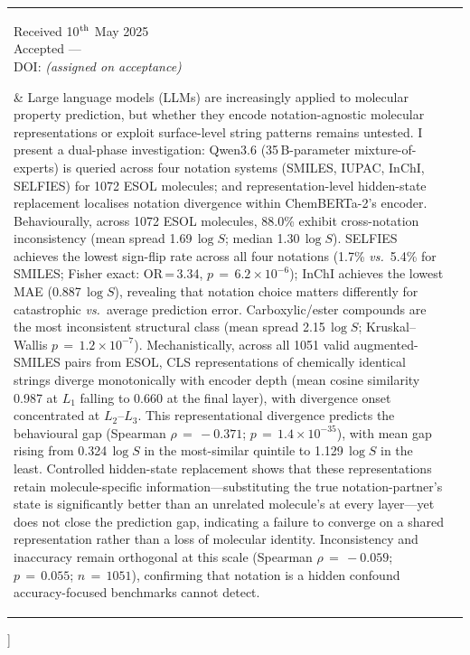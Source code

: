 \documentclass[twoside,twocolumn,9pt]{article}
\newcommand{\logS}{\ensuremath{\log S}}
\begin{document}
\begin{@twocolumnfalse}
\begin{tabular}{m{4.5cm} p{13.5cm} }
\parbox{4.2cm}{\sffamily\scriptsize
  Received 10$^{\rm th}$ May 2025\\
  Accepted \phantom{10}---\phantom{May 2025}\\[3pt]
  DOI: \textit{(assigned on acceptance)}} &
\noindent\normalsize{%
Large language models (LLMs) are increasingly applied to molecular property prediction, but whether they encode notation-agnostic molecular representations or exploit surface-level string patterns remains untested. I present a dual-phase investigation: Qwen3.6 (35\,B-parameter mixture-of-experts) is queried across four notation systems (SMILES, IUPAC, InChI, SELFIES) for 1072 ESOL molecules; and representation-level hidden-state replacement localises notation divergence within ChemBERTa-2's encoder. Behaviourally, across 1072 ESOL molecules, 88.0\% exhibit cross-notation inconsistency (mean spread 1.69\,$\logS$; median 1.30\,$\logS$). SELFIES achieves the lowest sign-flip rate across all four notations (1.7\% \textit{vs.}\ 5.4\% for SMILES; Fisher exact: OR\,=\,3.34, $p\,=\,6.2\!\times\!10^{-6}$); InChI achieves the lowest MAE (0.887\,$\logS$), revealing that notation choice matters differently for catastrophic \textit{vs.}\ average prediction error. Carboxylic/ester compounds are the most inconsistent structural class (mean spread 2.15\,$\logS$; Kruskal--Wallis $p\,=\,1.2\!\times\!10^{-7}$). Mechanistically, across all 1051 valid augmented-SMILES pairs from ESOL, CLS representations of chemically identical strings diverge monotonically with encoder depth (mean cosine similarity 0.987 at $L_1$ falling to 0.660 at the final layer), with divergence onset concentrated at $L_2$--$L_3$. This representational divergence predicts the behavioural gap (Spearman $\rho\,=\,-0.371$; $p\,=\,1.4\!\times\!10^{-35}$), with mean gap rising from 0.324\,$\logS$ in the most-similar quintile to 1.129\,$\logS$ in the least. Controlled hidden-state replacement shows that these representations retain molecule-specific information---substituting the true notation-partner's state is significantly better than an unrelated molecule's at every layer---yet does not close the prediction gap, indicating a failure to converge on a shared representation rather than a loss of molecular identity. Inconsistency and inaccuracy remain orthogonal at this scale (Spearman $\rho\,=\,-0.059$; $p\,=\,0.055$; $n\,=\,1051$), confirming that notation is a hidden confound accuracy-focused benchmarks cannot detect.%
} \\

\end{tabular}

 \end{@twocolumnfalse} \vspace{0.6cm}
]
\end{document}
